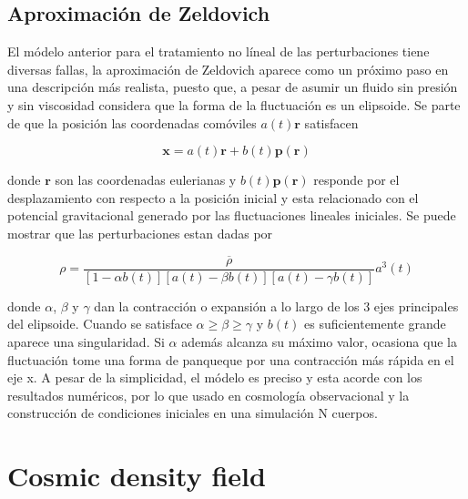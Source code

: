 \subsection{Aproximación de Zeldovich}

El módelo anterior para el tratamiento no líneal de las perturbaciones tiene
diversas fallas, la aproximación de Zeldovich aparece como un próximo paso
en una descripción más realista, puesto que, a pesar de asumir un fluido 
sin presión y sin viscosidad considera que la forma de la fluctuación es un
elipsoide. Se parte de que la posición las coordenadas comóviles 
$a(t)\textbf{r}$ satisfacen

\[
\textbf{x} = a(t)\textbf{r}+b(t)\textbf{p}(\textbf{r})
\]

donde $\textbf{r}$ son las coordenadas eulerianas y 
$b(t)\textbf{p}(\textbf{r})$ responde por el desplazamiento con respecto 
a la posición inicial y esta relacionado con el potencial gravitacional 
generado por las fluctuaciones lineales iniciales. 
Se puede mostrar que las perturbaciones estan dadas por 

\[
\rho = \frac{\overline{\rho} }{[1-\alpha b(t)][a(t)-\beta b(t)][a(t)-\gamma b(t)]}a^3(t)
\]

donde $\alpha$, $\beta$ y $\gamma$ dan la contracción o expansión a lo largo de 
los 3 ejes principales del elipsoide. Cuando se satisface $\alpha \geq \beta \geq \gamma$
y $b(t)$ es suficientemente grande aparece una singularidad. Si $\alpha$ además alcanza su máximo 
valor, ocasiona que la fluctuación tome una forma de panqueque por una contracción 
más rápida en el eje x.
A pesar de la simplicidad, el módelo es preciso y esta acorde con los resultados numéricos,
por lo que usado en cosmología observacional y la construcción de condiciones iniciales en 
una simulación N cuerpos.

\section{ Cosmic density field }
